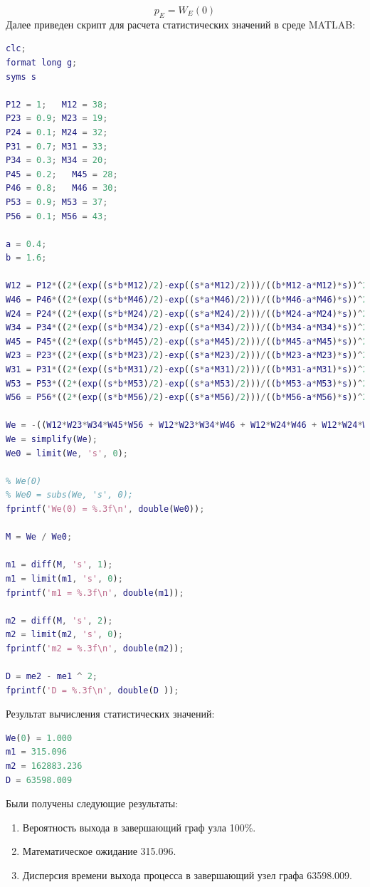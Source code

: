\documentclass[14pt,a4paper,report]{report}
\begin{document}
$$ p_E=W_E(0)$$
Далее приведен скрипт для расчета статистических значений в среде MATLAB:
\begin{lstlisting}[language={matlab}, caption={Скрипт Matlab}, basicstyle=\ttfamily]
clc;
format long g;
syms s

P12 = 1;   M12 = 38;
P23 = 0.9; M23 = 19; 
P24 = 0.1; M24 = 32; 
P31 = 0.7; M31 = 33; 
P34 = 0.3; M34 = 20; 
P45 = 0.2;   M45 = 28; 
P46 = 0.8;   M46 = 30; 
P53 = 0.9; M53 = 37; 
P56 = 0.1; M56 = 43; 

a = 0.4;
b = 1.6;

W12 = P12*((2*(exp((s*b*M12)/2)-exp((s*a*M12)/2)))/((b*M12-a*M12)*s))^2;
W46 = P46*((2*(exp((s*b*M46)/2)-exp((s*a*M46)/2)))/((b*M46-a*M46)*s))^2;
W24 = P24*((2*(exp((s*b*M24)/2)-exp((s*a*M24)/2)))/((b*M24-a*M24)*s))^2;
W34 = P34*((2*(exp((s*b*M34)/2)-exp((s*a*M34)/2)))/((b*M34-a*M34)*s))^2;
W45 = P45*((2*(exp((s*b*M45)/2)-exp((s*a*M45)/2)))/((b*M45-a*M45)*s))^2;
W23 = P23*((2*(exp((s*b*M23)/2)-exp((s*a*M23)/2)))/((b*M23-a*M23)*s))^2;
W31 = P31*((2*(exp((s*b*M31)/2)-exp((s*a*M31)/2)))/((b*M31-a*M31)*s))^2;
W53 = P53*((2*(exp((s*b*M53)/2)-exp((s*a*M53)/2)))/((b*M53-a*M53)*s))^2;
W56 = P56*((2*(exp((s*b*M56)/2)-exp((s*a*M56)/2)))/((b*M56-a*M56)*s))^2;

We = -((W12*W23*W34*W45*W56 + W12*W23*W34*W46 + W12*W24*W46 + W12*W24*W45*W56)/(W12*W23*W31 + W34*W45*W53 + W12*W24*W45*W53*W31 - 1));
We = simplify(We);
We0 = limit(We, 's', 0);

% We(0)
% We0 = subs(We, 's', 0);
fprintf('We(0) = %.3f\n', double(We0));

M = We / We0;

m1 = diff(M, 's', 1);
m1 = limit(m1, 's', 0);
fprintf('m1 = %.3f\n', double(m1));

m2 = diff(M, 's', 2);
m2 = limit(m2, 's', 0);
fprintf('m2 = %.3f\n', double(m2));

D = me2 - me1 ^ 2;
fprintf('D = %.3f\n', double(D ));
\end{lstlisting}


Результат вычисления статистических значений:

\begin{lstlisting}[language={matlab}, caption={Matlab скрипт}, basicstyle=\ttfamily]
We(0) = 1.000
m1 = 315.096
m2 = 162883.236
D = 63598.009
\end{lstlisting}

Были получены следующие результаты:
\begin{enumerate}
\item Вероятность выхода в завершающий граф узла 100\%.
\item Математическое ожидание 315.096.
\item Дисперсия времени выхода процесса в завершающий узел графа 63598.009.
\end{enumerate}
\end{document}
